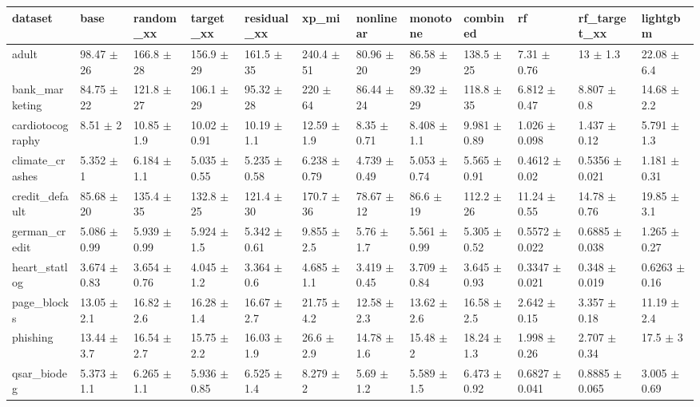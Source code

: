 \begin{tabular}{llllllllllll}
\toprule
dataset & base & random\_xx & target\_xx & residual\_xx & xp\_mi & nonlinear & monotone & combined & rf & rf\_target\_xx & lightgbm \\
\midrule
adult & 98.47 $\pm$ 26 & 166.8 $\pm$ 28 & 156.9 $\pm$ 29 & 161.5 $\pm$ 35 & 240.4 $\pm$ 51 & 80.96 $\pm$ 20 & 86.58 $\pm$ 29 & 138.5 $\pm$ 25 & 7.31 $\pm$ 0.76 & 13 $\pm$ 1.3 & 22.08 $\pm$ 6.4 \\
bank\_marketing & 84.75 $\pm$ 22 & 121.8 $\pm$ 27 & 106.1 $\pm$ 29 & 95.32 $\pm$ 28 & 220 $\pm$ 64 & 86.44 $\pm$ 24 & 89.32 $\pm$ 29 & 118.8 $\pm$ 35 & 6.812 $\pm$ 0.47 & 8.807 $\pm$ 0.8 & 14.68 $\pm$ 2.2 \\
cardiotocography & 8.51 $\pm$ 2 & 10.85 $\pm$ 1.9 & 10.02 $\pm$ 0.91 & 10.19 $\pm$ 1.1 & 12.59 $\pm$ 1.9 & 8.35 $\pm$ 0.71 & 8.408 $\pm$ 1.1 & 9.981 $\pm$ 0.89 & 1.026 $\pm$ 0.098 & 1.437 $\pm$ 0.12 & 5.791 $\pm$ 1.3 \\
climate\_crashes & 5.352 $\pm$ 1 & 6.184 $\pm$ 1.1 & 5.035 $\pm$ 0.55 & 5.235 $\pm$ 0.58 & 6.238 $\pm$ 0.79 & 4.739 $\pm$ 0.49 & 5.053 $\pm$ 0.74 & 5.565 $\pm$ 0.91 & 0.4612 $\pm$ 0.02 & 0.5356 $\pm$ 0.021 & 1.181 $\pm$ 0.31 \\
credit\_default & 85.68 $\pm$ 20 & 135.4 $\pm$ 35 & 132.8 $\pm$ 25 & 121.4 $\pm$ 30 & 170.7 $\pm$ 36 & 78.67 $\pm$ 12 & 86.6 $\pm$ 19 & 112.2 $\pm$ 26 & 11.24 $\pm$ 0.55 & 14.78 $\pm$ 0.76 & 19.85 $\pm$ 3.1 \\
german\_credit & 5.086 $\pm$ 0.99 & 5.939 $\pm$ 0.99 & 5.924 $\pm$ 1.5 & 5.342 $\pm$ 0.61 & 9.855 $\pm$ 2.5 & 5.76 $\pm$ 1.7 & 5.561 $\pm$ 0.99 & 5.305 $\pm$ 0.52 & 0.5572 $\pm$ 0.022 & 0.6885 $\pm$ 0.038 & 1.265 $\pm$ 0.27 \\
heart\_statlog & 3.674 $\pm$ 0.83 & 3.654 $\pm$ 0.76 & 4.045 $\pm$ 1.2 & 3.364 $\pm$ 0.6 & 4.685 $\pm$ 1.1 & 3.419 $\pm$ 0.45 & 3.709 $\pm$ 0.84 & 3.645 $\pm$ 0.93 & 0.3347 $\pm$ 0.021 & 0.348 $\pm$ 0.019 & 0.6263 $\pm$ 0.16 \\
page\_blocks & 13.05 $\pm$ 2.1 & 16.82 $\pm$ 2.6 & 16.28 $\pm$ 1.4 & 16.67 $\pm$ 2.7 & 21.75 $\pm$ 4.2 & 12.58 $\pm$ 2.3 & 13.62 $\pm$ 2.6 & 16.58 $\pm$ 2.5 & 2.642 $\pm$ 0.15 & 3.357 $\pm$ 0.18 & 11.19 $\pm$ 2.4 \\
phishing & 13.44 $\pm$ 3.7 & 16.54 $\pm$ 2.7 & 15.75 $\pm$ 2.2 & 16.03 $\pm$ 1.9 & 26.6 $\pm$ 2.9 & 14.78 $\pm$ 1.6 & 15.48 $\pm$ 2 & 18.24 $\pm$ 1.3 & 1.998 $\pm$ 0.26 & 2.707 $\pm$ 0.34 & 17.5 $\pm$ 3 \\
qsar\_biodeg & 5.373 $\pm$ 1.1 & 6.265 $\pm$ 1.1 & 5.936 $\pm$ 0.85 & 6.525 $\pm$ 1.4 & 8.279 $\pm$ 2 & 5.69 $\pm$ 1.2 & 5.589 $\pm$ 1.5 & 6.473 $\pm$ 0.92 & 0.6827 $\pm$ 0.041 & 0.8885 $\pm$ 0.065 & 3.005 $\pm$ 0.69 \\

\end{tabular}
